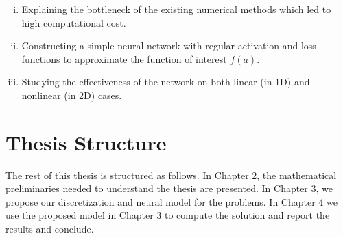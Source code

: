 \begin{enumerate}[i.]
	\item Explaining the bottleneck of the existing numerical methods which led to high computational cost.
	\item Constructing a simple neural network with regular activation and loss functions to approximate the function of interest $f(a)$.
	\item Studying the effectiveness of the network on both linear (in 1D) and nonlinear (in 2D) cases.
\end{enumerate}
\section{Thesis Structure}
The rest of this thesis is structured as follows. In Chapter 2, the mathematical preliminaries needed to understand the thesis are presented. In Chapter 3, we propose our discretization and neural model for the problems. In Chapter 4 we use the proposed model in Chapter 3 to compute the solution and report the results and conclude.












